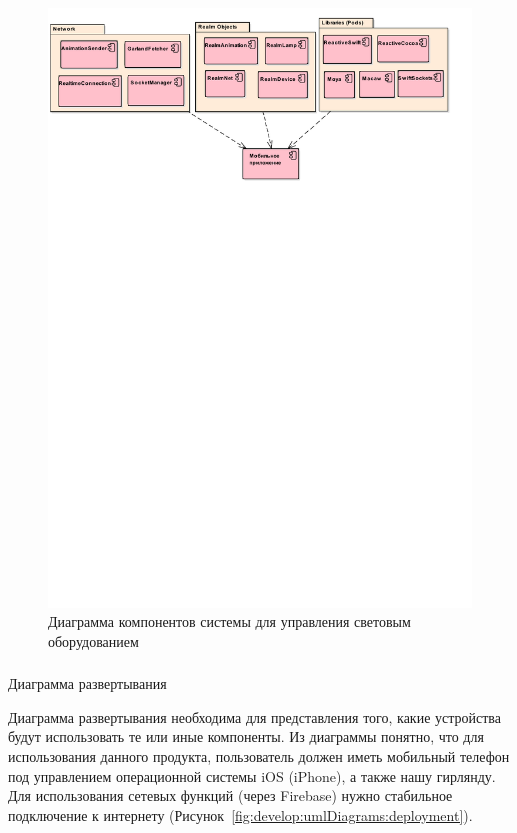 ~
\begin{figure}[H]
\centering
	\includegraphics[scale=0.8]{figures/uml_component.pdf}
	\caption{Диаграмма компонентов системы для управления световым оборудованием}
	\label{fig:develop:umlDiagrams:component}
\end{figure}

\subsubsection{} Диаграмма развертывания
\label{sec:develop:umlDiagrams:deployment}

Диаграмма развертывания необходима для представления того, какие устройства будут использовать те или иные компоненты. Из диаграммы понятно, что для использования данного продукта, пользователь должен иметь мобильный телефон под управлением операционной системы iOS (iPhone), а также нашу гирлянду. Для использования сетевых функций (через Firebase) нужно стабильное подключение к интернету (Рисунок~\ref{fig:develop:umlDiagrams:deployment}).

